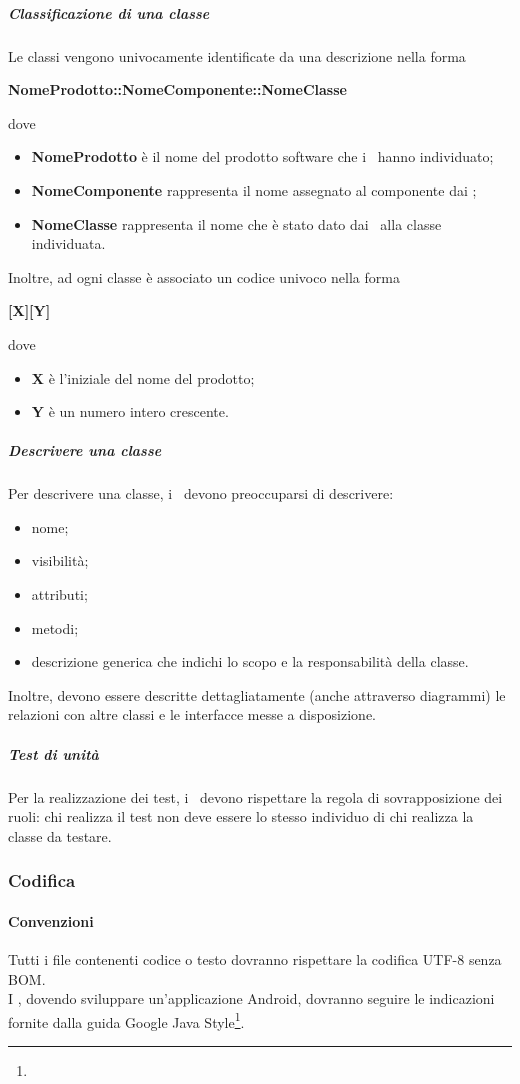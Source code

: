 \documentclass[../NormeProgetto.tex]{subfiles}
\begin{document}
			\subparagraph{Classificazione di una classe}
				Le classi vengono univocamente identificate da una descrizione nella forma \begin{center}
				\textbf{NomeProdotto::NomeComponente::NomeClasse}
				\end{center} dove
				\begin{itemize}
					\item \textbf{NomeProdotto} è il nome del prodotto software che i \progettisti\ hanno individuato;
					\item \textbf{NomeComponente} rappresenta il nome assegnato al componente dai \progettisti;
					\item \textbf{NomeClasse} rappresenta il nome che è stato dato dai \progettisti\ alla classe individuata.
				\end{itemize}
				Inoltre, ad ogni classe è associato un codice univoco nella forma \begin{center}
				\textbf{[X][Y]}
				\end{center} dove
				\begin{itemize}
					\item \textbf{X} è l'iniziale del nome del prodotto;
					\item \textbf{Y} è un numero intero crescente.
				\end{itemize}
			\subparagraph{Descrivere una classe}			
				Per descrivere una classe, i \progettisti\ devono preoccuparsi di descrivere:
				\begin{itemize}
					\item nome;
					\item visibilità;
					\item attributi;
					\item metodi;
					\item descrizione generica che indichi lo scopo e la responsabilità della classe.
				\end{itemize}
				Inoltre, devono essere descritte dettagliatamente (anche attraverso diagrammi) le relazioni con altre classi e le interfacce messe a disposizione.
			\subparagraph{Test di unità}
				Per la realizzazione dei test, i \progettisti\ devono rispettare la regola di sovrapposizione dei ruoli: chi realizza il test non deve essere lo stesso individuo di chi realizza la classe da testare.
		\subsubsection{Codifica}
			\paragraph{Convenzioni}
				Tutti i file contenenti codice o testo dovranno rispettare la codifica UTF-8 senza BOM.\\
				I \programmatori, dovendo sviluppare un'applicazione Android, dovranno seguire le indicazioni fornite dalla guida Google Java Style\footnote{}.
\end{document}
